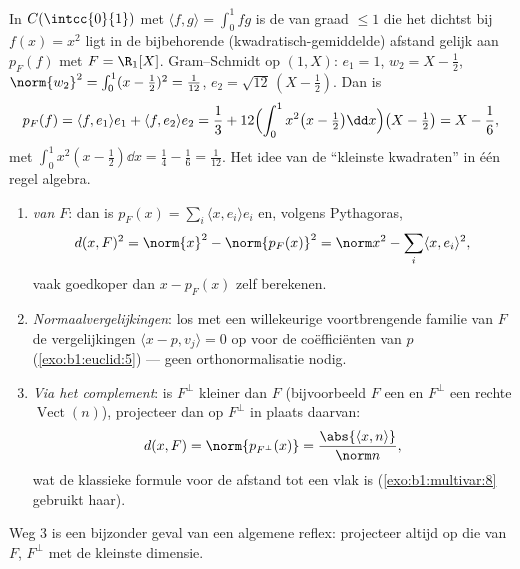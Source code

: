 \begin{example}\label{ex:b1:euclid:bestapprox}
In $C(\intcc{0}{1})$ met $\langle f, g\rangle = \int_0^1 fg$ is de
 van graad $\leq 1$ die het dichtst bij $f(x) = x^2$ ligt
in de bijbehorende (kwadratisch-gemiddelde) afstand gelijk aan
$p_F(f)$ met $F = \R_1[X]$. Gram--Schmidt op $(1, X)$: $e_1 = 1$,
$w_2 = X - \frac12$, $\norm{w_2}^2 = \int_0^1 (x - \frac12)^2 =
\frac{1}{12}$, $e_2 = \sqrt{12}\,(X - \tfrac12)$. Dan is
\[
p_F(f) = \langle f, e_1\rangle e_1 + \langle f, e_2\rangle e_2
= \frac13 + 12\Bigl(\int_0^1 x^2\bigl(x - \tfrac12\bigr)\dd
x\Bigr)\bigl(X - \tfrac12\bigr)
= X - \frac{1}{6},
\]
met $\int_0^1 x^2(x - \frac12)\dd x = \frac14 - \frac16 =
\frac{1}{12}$. Het idee van de ``kleinste kwadraten'' in één regel
 algebra.
\end{example}

\begin{method}
\label{met:b1:euclid:distance}
\begin{enumerate}
  \item \emph{  van $F$}: dan is $p_F(x) = \sum_i
        \langle x, e_i\rangle e_i$ en, volgens Pythagoras,
        \[
        d(x, F)^2 = \norm{x}^2 - \norm{p_F(x)}^2
        = \norm x^2 - \sum_i \langle x, e_i\rangle^2 ,
        \]
        vaak goedkoper dan $x - p_F(x)$ zelf berekenen.
  \item \emph{Normaalvergelijkingen}: los met een willekeurige
        voortbrengende familie van $F$ de vergelijkingen $\langle x
        - p, v_j\rangle = 0$ op voor de coëfficiënten van $p$
        (\cref{exo:b1:euclid:5}) --- geen orthonormalisatie nodig.
  \item \emph{Via het complement}: is $F^\perp$ kleiner dan $F$
        (bijvoorbeeld $F$ een  en $F^\perp$ een rechte
        $\operatorname{Vect}(n)$), projecteer dan op $F^\perp$ in
        plaats daarvan:
        \[
        d(x, F) = \norm{p_{F^\perp}(x)} =
        \frac{\abs{\langle x, n\rangle}}{\norm n} ,
        \]
        wat de klassieke formule voor de afstand tot een vlak is
        (\cref{exo:b1:multivar:8} gebruikt haar).
\end{enumerate}
Weg 3 is een bijzonder geval van een algemene reflex: projecteer
altijd op die van $F$, $F^\perp$ met de kleinste dimensie.
\end{method}

